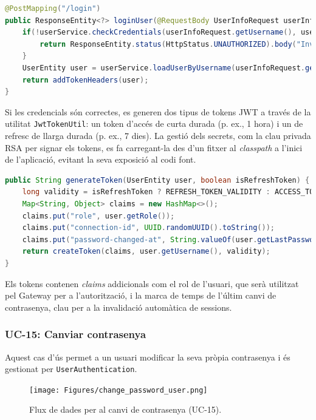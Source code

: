 \begin{lstlisting}[language=Java, caption={Endpoint de login a `AuthenticationController`}]
@PostMapping("/login")
public ResponseEntity<?> loginUser(@RequestBody UserInfoRequest userInfoRequest) {
    if(!userService.checkCredentials(userInfoRequest.getUsername(), userInfoRequest.getPassword())) {
        return ResponseEntity.status(HttpStatus.UNAUTHORIZED).body("Invalid credentials");
    }
    UserEntity user = userService.loadUserByUsername(userInfoRequest.getUsername());
    return addTokenHeaders(user);
}
\end{lstlisting}

Si les credencials són correctes, es generen dos tipus de tokens JWT a través de la utilitat \texttt{JwtTokenUtil}: un token d'accés de curta durada (p. ex., 1 hora) i un de refresc de llarga durada (p. ex., 7 dies). La gestió dels secrets, com la clau privada RSA per signar els tokens, es fa carregant-la des d'un fitxer al \textit{classpath} a l'inici de l'aplicació, evitant la seva exposició al codi font.

\begin{lstlisting}[language=Java, caption={Generació de tokens a la classe `JwtTokenUtil`}]
public String generateToken(UserEntity user, boolean isRefreshToken) {
    long validity = isRefreshToken ? REFRESH_TOKEN_VALIDITY : ACCESS_TOKEN_VALIDITY;
    Map<String, Object> claims = new HashMap<>();
    claims.put("role", user.getRole());
    claims.put("connection-id", UUID.randomUUID().toString());
    claims.put("password-changed-at", String.valueOf(user.getLastPasswordChange().getTime()));
    return createToken(claims, user.getUsername(), validity);
}
\end{lstlisting}

Els tokens contenen \textit{claims} addicionals com el rol de l'usuari, que serà utilitzat pel Gateway per a l'autorització, i la marca de temps de l'últim canvi de contrasenya, clau per a la invalidació automàtica de sessions.

\subsubsection{UC-15: Canviar contrasenya}

Aquest cas d'ús permet a un usuari modificar la seva pròpia contrasenya i és gestionat per \texttt{UserAuthentication}.

\begin{figure}[H]
    \centering
    \texttt{[image: Figures/change\_password\_user.png]}
    \caption{Flux de dades per al canvi de contrasenya (UC-15).}
\end{figure}

